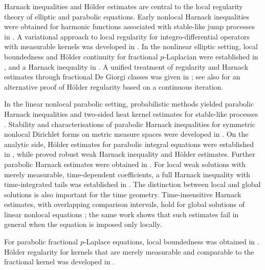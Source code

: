\documentclass[10pt]{amsart}
\theoremstyle{plain}
\theoremstyle{definition}
\theoremstyle{remark}
\numberwithin{equation}{section}
\begin{document}
Harnack inequalities and H\"older estimates are central to the local
regularity theory of elliptic and parabolic equations. Early nonlocal
Harnack inequalities were obtained for harmonic functions associated
with stable-like jump processes in \cite{BassLevin}. A variational
approach to local regularity for integro-differential operators with
measurable kernels was developed in \cite{KassmannRegularity}.
In the nonlinear elliptic setting, local boundedness and H\"older
continuity for fractional $p$-Laplacian were established in
\cite{DKPRegularity}, and a Harnack inequality in \cite{DKPHarnack}.
A unified treatment of regularity and Harnack estimates through
fractional De Giorgi classes was given in \cite{Cozzi}; see also
\cite{APTElliptic} for an alternative proof of H\"older regularity
based on a continuous iteration.

In the linear nonlocal parabolic setting, probabilistic methods
yielded parabolic Harnack inequalities and two-sided heat kernel
estimates for stable-like processes
\cite{ChenKumagai}. Stability and characterisations of parabolic
Harnack inequalities for symmetric nonlocal Dirichlet forms on
metric measure spaces were developed in \cite{ChenKumagaiWang}.
On the analytic side, H\"older estimates for parabolic integral
equations were established in \cite{CaffarelliChanVasseur}, while
\cite{FelsingerKassmann} proved robust weak Harnack inequality and H\"older estimates. Further
parabolic Harnack estimates were obtained in
\cite{StromqvistHarnack}. For local weak solutions with merely
measurable, time-dependent coefficients, a full Harnack inequality
with time-integrated tails was established in
\cite{KassmannWeidner}. 
The distinction between local and global solutions is also important
for the time geometry. Time-insensitive Harnack estimates, with
overlapping comparison intervals, hold for global solutions of
linear nonlocal equations \cite{LiaoWeidner}; the same work shows
that such estimates fail in general when the equation is imposed
only locally. 

For parabolic fractional $p$-Laplace equations, local boundedness
was obtained in \cite{Stromqvist,DingZhangZhou, PrasadTewary}.  H\"older regularity for kernels
that are merely measurable and comparable to the fractional kernel
was developed in \cite{APT,LiaoHolder}.
\end{document}
